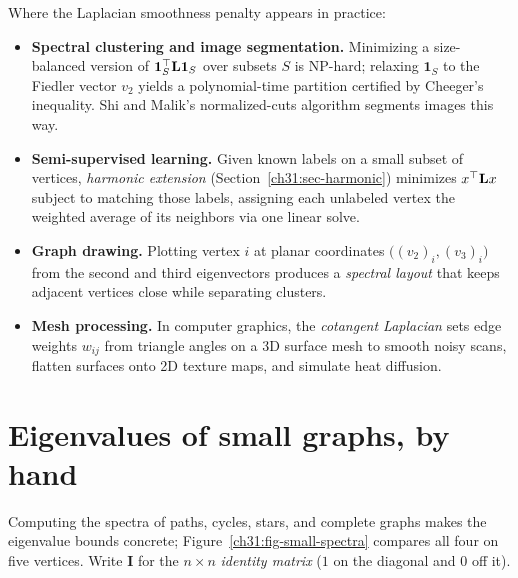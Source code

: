 \begin{applicationbox}
Where the Laplacian smoothness penalty appears in practice:
\begin{itemize}
  \item \textbf{Spectral clustering and image segmentation.} Minimizing a size-balanced version of $\mathbf{1}_S^\top\mathbf{L}\mathbf{1}_S$ over subsets $S$ is $\mathrm{NP}$-hard; relaxing $\mathbf{1}_S$ to the Fiedler vector $v_2$ yields a polynomial-time partition certified by Cheeger's inequality. Shi and Malik's normalized-cuts algorithm segments images this way.
  \item \textbf{Semi-supervised learning.} Given known labels on a small subset of vertices, \emph{harmonic extension} (Section~\ref{ch31:sec-harmonic}) minimizes $x^\top\mathbf{L} x$ subject to matching those labels, assigning each unlabeled vertex the weighted average of its neighbors via one linear solve.
  \item \textbf{Graph drawing.} Plotting vertex $i$ at planar coordinates $\bigl((v_2)_i, (v_3)_i\bigr)$ from the second and third eigenvectors produces a \emph{spectral layout} that keeps adjacent vertices close while separating clusters.
  \item \textbf{Mesh processing.} In computer graphics, the \emph{cotangent Laplacian} sets edge weights $w_{ij}$ from triangle angles on a 3D surface mesh to smooth noisy scans, flatten surfaces onto 2D texture maps, and simulate heat diffusion.
\end{itemize}
\end{applicationbox}

\section{Eigenvalues of small graphs, by hand}

Computing the spectra of paths, cycles, stars, and complete graphs makes the eigenvalue bounds concrete; Figure~\ref{ch31:fig-small-spectra} compares all four on five vertices. Write $\mathbf{I}$ for the $n\times n$ \emph{identity matrix} ($1$ on the diagonal and $0$ off it).

